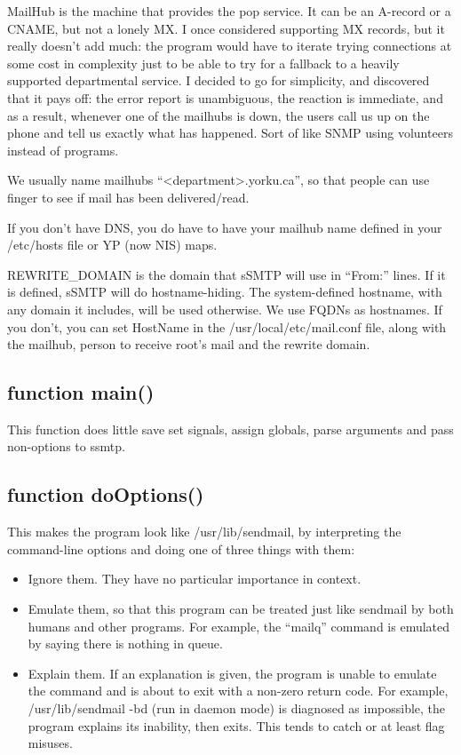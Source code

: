   MailHub is the machine that provides the pop service. It can be
an A-record or a CNAME, but not a lonely MX.
  I once considered supporting MX records, but it really doesn't add much:
the program would have to iterate trying connections at some cost in
complexity just to be able to try for a fallback to a heavily supported
departmental service.  I decided to go for simplicity, and discovered that
it pays off: the error report is unambiguous, the reaction is immediate, and
as a result, whenever one of the mailhubs is down, the users call us up on
the phone and tell us exactly what has happened.  Sort of like SNMP using
volunteers instead of programs.

 We usually name mailhubs ``<department>.yorku.ca'', so that people can use
finger to see if mail has been delivered/read. 

  If you don't have DNS, you do have to have your mailhub name defined in 
your /etc/hosts file or YP (now NIS) maps.  

  REWRITE\_DOMAIN is the domain that sSMTP will use in ``From:'' lines.  If
it is defined, sSMTP will do hostname-hiding.  The system-defined hostname,
with any domain it includes, will be used otherwise. 
  We use FQDNs as hostnames.  If you don't, you can set HostName in the /usr/local/etc/mail.conf
file, along with the mailhub, person to receive root's mail and the rewrite domain.

\subsection{function main()}
	This function does little save set signals, assign globals, 
parse arguments and pass non-options to ssmtp.

\subsection{function doOptions()}
	This makes the program look like /usr/lib/sendmail, by
interpreting the command-line options and doing one of three
things with them:

\begin{itemize}
\item Ignore them.  They have no particular importance in context.
\item Emulate them, so that this program can be treated just like
	sendmail by both humans and other programs.  For example,
	the ``mailq'' command is emulated by saying there is nothing 
	in queue.
\item Explain them. If an explanation is given, the program is unable
	to emulate the command and is about to exit with a non-zero
	return code.  For example, /usr/lib/sendmail -bd (run in daemon mode)
	is diagnosed as impossible, the program explains its inability,
	then exits.  This tends to catch or at least flag misuses.
\end{itemize}

